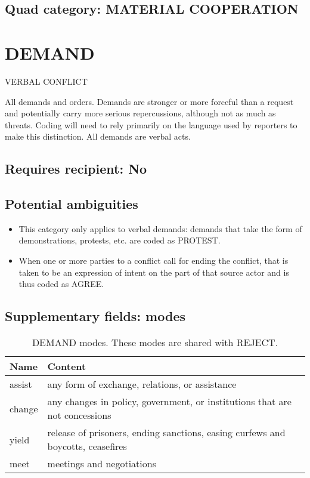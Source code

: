 \documentclass[11pt]{report}
\newcommand{\plcat}[1]{\textsf{#1}}
\begin{document}
\subsection{Quad category: MATERIAL COOPERATION}



\newpage  

\section{DEMAND}

\textsf{VERBAL CONFLICT} \vspace{8pt}


All demands and orders. Demands are stronger or more forceful than a request and potentially carry more serious repercussions, although not as much as threats. Coding will need to rely primarily on the language used by reporters to make this distinction.  All demands are verbal acts. 

\subsection{Requires recipient: No}


\subsection{Potential ambiguities}

\begin{itemize}
\item This category only applies to verbal demands: demands that take the form of demonstrations, protests, etc. are coded as \plcat{PROTEST}.
\item When one or more parties to a conflict call for ending the conflict, that is taken to be an expression of intent on the part of that source actor and is thus coded as \plcat{AGREE}.

\end{itemize}


\subsection{Supplementary fields: modes}


\begin{table}[htp]
\caption{DEMAND modes. These modes are shared with REJECT.}
\begin{center}
\begin{tabular}{|l|p{13cm}|}
\hline
Name & Content \\
\hline
assist & any form of exchange, relations, or assistance\\
change & any changes in policy, government, or institutions that are not concessions \\
yield & release of prisoners, ending sanctions, easing curfews and boycotts, ceasefires\\
meet & meetings and negotiations\\
\hline
\end{tabular}
\end{center}
\label{tab:demandmode2}
\end{table}%
\end{document}
